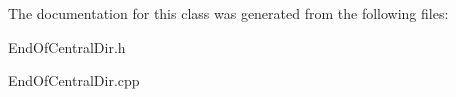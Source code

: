 The documentation for this class was generated from the following files\+:\begin{DoxyCompactItemize}
\item 
End\+Of\+Central\+Dir.\+h\item 
End\+Of\+Central\+Dir.\+cpp\end{DoxyCompactItemize}
